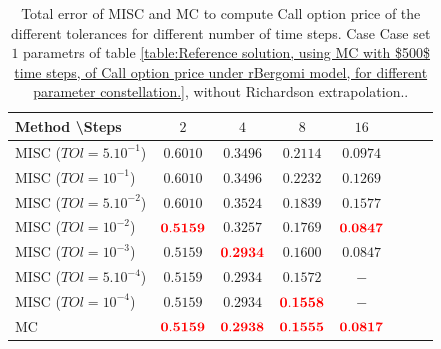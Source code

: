 \documentclass[11pt]{article}
\begin{document}
\begin{table}[h!]
	\centering
	\begin{tabular}{l*{6}{c}r}
		Method \textbackslash  Steps            & $2$ & $4$ & $8$ & $16$  \\
		\hline
		MISC ($TOl=5.10^{-1}$)  & $\mathbf{0.6010}$ & $\mathbf{0.3496}$ & $\mathbf{ 0.2114}$ & $\mathbf{ 0.0974}$  \\
		MISC ($TOl=10^{-1}$)  & $\mathbf{0.6010}$ & $\mathbf{0.3496}$ & $\mathbf{  0.2232}$ & $\mathbf{
			0.1269}$  \\
		MISC ($TOl=5.10^{-2}$)  &$\mathbf{0.6010}$ & $\mathbf{  0.3524}$ & $\mathbf{ 0.1839}$ & $\mathbf{  0.1577}$  \\
		MISC ($TOl=10^{-2}$)  & $\mathbf{{\color{red}0.5159}}$ & $\mathbf{0.3257}$ & $\mathbf{ 0.1769}$ & $\mathbf{  {\color{red}0.0847}}$  \\
		MISC ($TOl=10^{-3}$)  & $\mathbf{0.5159}$ & $\mathbf{{\color{red}0.2934}}$ & $\mathbf{0.1600}$ & $\mathbf{0.0847}$  \\
		MISC ($TOl=5.10^{-4}$)  & $\mathbf{0.5159}$ & $\mathbf{0.2934}$ & $\mathbf{0.1572}$ & $\mathbf{-}$  \\
		MISC ($TOl=10^{-4}$)  & $\mathbf{0.5159}$ & $\mathbf{0.2934}$ & $\mathbf{{\color{red}0.1558}}$ & $\mathbf{-}$  \\
		\hline
		MC     & $\mathbf{{\color{red}0.5159}}$ & $\mathbf{{\color{red}0.2938}}$ & $\mathbf{{\color{red}0.1555}}$ &$\mathbf{  {\color{red}0.0817}}$  \\	
%		
		
		\hline
	\end{tabular}
	\caption{Total error of MISC and MC to compute Call option price of the different tolerances for different number of time steps. Case Case set $1$ parametrs of table \ref{table:Reference solution, using MC with $500$ time steps, of Call option price under rBergomi model, for different parameter constellation.}, without Richardson extrapolation..}
	\label{Total error of MISC and MC to compute Call option price of the different tolerances for different number of time steps. Case set 1, without Richardson extrapolation. The numbers between parentheses are the corresponding absolute errors.}
\end{table}
\end{document}
